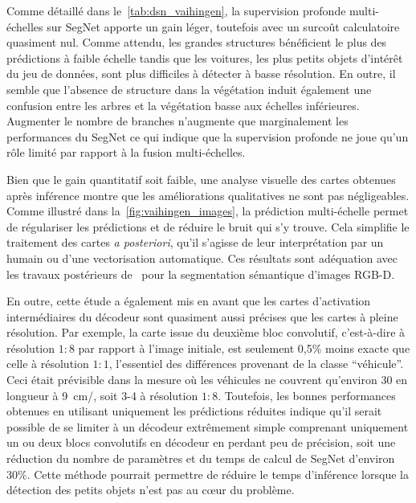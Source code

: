 Comme détaillé dans le~\cref{tab:dsn_vaihingen}, la supervision profonde multi-échelles sur SegNet apporte un gain léger, toutefois avec un surcoût calculatoire quasiment nul. Comme attendu, les grandes structures bénéficient le plus des prédictions à faible échelle tandis que les voitures, les plus petits objets d'intérêt du jeu de données, sont plus difficiles à détecter à basse résolution. En outre, il semble que l'absence de structure dans la végétation induit également une confusion entre les arbres et la végétation basse aux échelles inférieures. Augmenter le nombre de branches n'augmente que marginalement les performances du SegNet ce qui indique que la supervision profonde ne joue qu'un rôle limité par rapport à la fusion multi-échelles.

Bien que le gain quantitatif soit faible, une analyse visuelle des cartes obtenues après inférence montre que les améliorations qualitatives ne sont pas négligeables. Comme illustré dans la~\cref{fig:vaihingen_images}, la prédiction multi-échelle permet de régulariser les prédictions et de réduire le bruit qui s'y trouve. Cela simplifie le traitement des cartes \emph{a posteriori}, qu'il s'agisse de leur interprétation par un humain ou d'une vectorisation automatique. Ces résultats sont adéquation avec les travaux postérieurs de~\citet{jiang_rednet_2018} pour la segmentation sémantique d'images \gls{RGB-D}.

En outre, cette étude a également mis en avant que les cartes d'activation intermédiaires du décodeur sont quasiment aussi précises que les cartes à pleine résolution. Par exemple, la carte issue du deuxième bloc convolutif, c'est-à-dire à résolution $1:8$ par rapport à l'image initiale, est seulement 0,5\% moins exacte que celle à résolution $1:1$, l'essentiel des différences provenant de la classe ``véhicule''. Ceci était prévisible dans la mesure où les véhicules ne couvrent qu'environ \SI{30}{\px} en longueur à \SI{9}{\centi\meter/\px}, soit 3-\SI{4}{\px} à résolution $1:8$. Toutefois, les bonnes performances obtenues en utilisant uniquement les prédictions réduites indique qu'il serait possible de se limiter à un décodeur extrêmement simple comprenant uniquement un ou deux blocs convolutifs en décodeur en perdant peu de précision, soit une réduction du nombre de paramètres et du temps de calcul de SegNet d'environ 30\%. Cette méthode pourrait permettre de réduire le temps d'inférence lorsque la détection des petits objets n'est pas au c\oe{}ur du problème.

